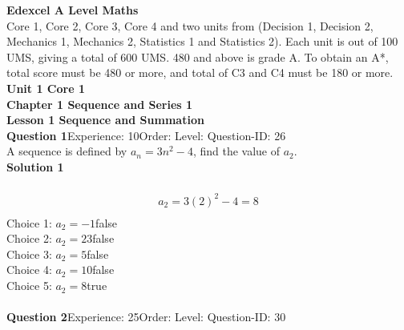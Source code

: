 \documentclass{article}
\begin{document}
\noindent\Huge{\textbf{Edexcel A Level Maths}}\\[5pt]
\noindent\large{Core 1, Core 2, Core 3, Core 4 and two units from (Decision 1, Decision 2, Mechanics 1, Mechanics 2, Statistics 1 and Statistics 2).  Each unit is out of 100 UMS, giving a total of 600 UMS.  480 and above is grade A.  To obtain an A*, total score must be 480 or more, and total of C3 and C4 must be 180 or more.}\\[20pt]
\noindent\huge{\textbf{Unit 1 Core 1}}\\[18pt]
\noindent\huge{\textbf{Chapter 1 Sequence and Series 1}}\\[15pt]
\noindent\huge{\textbf{Lesson 1 Sequence and Summation}}\\[12pt]
\noindent\textbf{Question 1}\hspace{20pt}Experience: 10\hspace{20pt}Order: \hspace{20pt}Level: \hspace{20pt}Question-ID: 26\\[2pt]
A sequence is defined by $a_n=3n^2-4$, find the value of $a_2$.\\[4pt]
\noindent\textbf{Solution 1}\\[2pt]
\\[-35pt]\begin{align*}
a_2=3(2)^2-4=8\\[2pt]
\end{align*}
Choice 1: \hspace{20pt}$a_2=-1$\hspace{20pt}false\\
Choice 2: \hspace{20pt}$a_2=23$\hspace{20pt}false\\
Choice 3: \hspace{20pt}$a_2=5$\hspace{20pt}false\\
Choice 4: \hspace{20pt}$a_2=10$\hspace{20pt}false\\
Choice 5: \hspace{20pt}$a_2=8$\hspace{20pt}true\\
\\[4pt]
\noindent\textbf{Question 2}\hspace{20pt}Experience: 25\hspace{20pt}Order: \hspace{20pt}Level: \hspace{20pt}Question-ID: 30\\[2pt]
\end{document}
